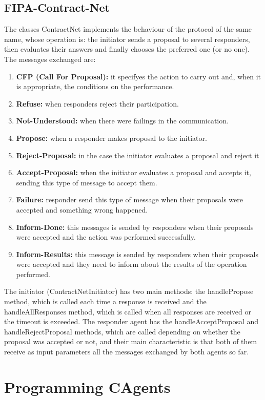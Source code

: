  \subsection{FIPA-Contract-Net}
The classes ContractNet implements the behaviour of the protocol of the same name, whose operation is: the initiator sends a proposal to several responders, then evaluates their answers and finally chooses the preferred one (or no one). The messages exchanged are:
\begin{enumerate}
\item \textbf{CFP (Call For Proposal):} it specifyes  the action to carry out and, when it is appropriate, the conditions on the performance.
\item \textbf{Refuse:} when responders reject their participation.
\item \textbf{Not-Understood:} when there were failings in the communication.
\item \textbf{Propose:} when a responder makes proposal to the initiator.
\item \textbf{Reject-Proposal:} in the case the initiator evaluates a proposal and reject it
\item \textbf{Accept-Proposal:} when the initiator evaluates a proposal and accepts it, sending this type of message to accept them.
\item \textbf{Failure:} responder send this type of message when their proposals were accepted and something wrong happened.
\item \textbf{Inform-Done:} this messages is sended by responders when their proposals were accepted and the action was performed successfully.
\item \textbf{Inform-Results:} this message is sended by responders when their proposals were accepted and they need to inform about the results of the operation performed.
\end{enumerate}
The initiator (ContractNetInitiator) has two main methods: the handlePropose method, which is called each time a response is received and the handleAllResponses method, which is called when all responses are received or the timeout is exceeded.  The responder agent has the handleAcceptProposal and handleRejectProposal methods, which are called depending on whether the proposal was accepted or not, and their main characteristic is that both of them receive  as input parameters all the messages exchanged by both agents so far.


\section{Programming CAgents} %
\label{sec:presenting_cagents}

